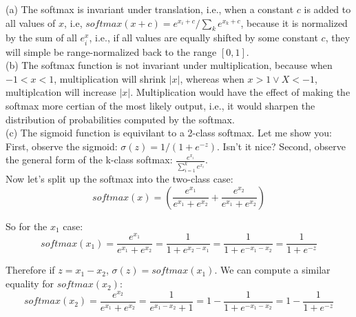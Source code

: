 \documentclass{amsart}
\theoremstyle{definition}
\theoremstyle{remark}
\numberwithin{equation}{section}
\begin{document}
(a) The softmax is invariant under translation, i.e., when a constant $c$ is
added to all values of $x$, i.e, $softmax(x+c) = e^{x_i+c}/\sum_k e^{x_k + c}$,
because it is normalized by the sum of all $e^x_i$, i.e., if all values are
equally shifted by some constant $c$, they will simple be range-normalized back to the
range $[0, 1]$. \\

(b) The softmax function is not invariant under multiplication, because when
$-1 < x < 1$, multiplication will shrink $|x|$, whereas when $x > 1 \vee X < -1$,
multiplcation will increase $|x|$. Multiplication would have the effect of making
the softmax more certian of the most likely output, i.e., it would sharpen
the distribution of probabilities computed by the softmax. \\

(c) The sigmoid function is equivilant to a 2-class softmax. Let me show you: \\

First, observe the sigmoid: $\sigma(z) = 1/(1 + e^{-z})$. Isn't it nice? Second, observe the
general form of the k-class softmax: $\frac{e^{x_i}}{\sum_{i=1}^k e^{x_i}}$. \\

Now let's split up the softmax into the two-class case:\\

\begin{equation}
softmax(x) = \left(\frac{e^{x_1}}{e^{x_1} + e^{x_2}} + \frac{e^{x_2}}{e^{x_1} + e^{x_2}}\right)
\end{equation}

So for the $x_1$ case: \\

\begin{equation}
softmax(x_1) =       \frac{e^{x_1}}{e^{x_1} + e^{x_2}}
             =       \frac{1}{1 + e^{x_2-x_1}}
             =       \frac{1}{1 + e^{-x_1-x_2}}
             =       \frac{1}{1 + e^{-z}}
\end{equation}

Therefore if $z = x_1 - x_2$, $\sigma(z) = softmax(x_1)$. We can compute a
similar equality for $softmax(x_2)$: \\

\begin{equation}
softmax(x_2) =       \frac{e^{x_2}}{e^{x_1} + e^{x_2}}
             =       \frac{1}{e^{x_1-x_2} + 1}
             =   1 - \frac{1}{1 + e^{-x_1-x_2}}
             =   1 - \frac{1}{1 + e^{-z}}

\end{equation}
\end{document}
